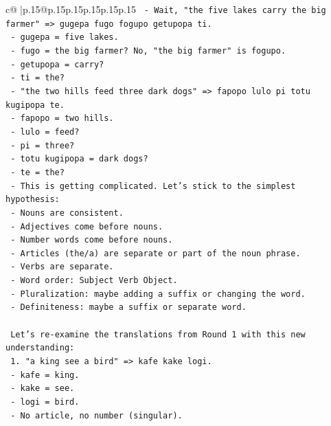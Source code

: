 \documentclass{article}
\begin{document}
{\begin{supertabular}{c@{$\;$}|p{.15\linewidth}@{}p{.15\linewidth}p{.15\linewidth}p{.15\linewidth}p{.15\linewidth}p{.15\linewidth}}
{{{\texttt{        {-} Wait, "the five lakes carry the big farmer" => gugepa fugo fogupo getupopa ti.} \\
\texttt{          {-} gugepa = five lakes.} \\
\texttt{          {-} fugo = the big farmer? No, "the big farmer" is fogupo.} \\
\texttt{          {-} getupopa = carry?} \\
\texttt{          {-} ti = the?} \\
\texttt{        {-} "the two hills feed three dark dogs" => fapopo lulo pi totu kugipopa te.} \\
\texttt{          {-} fapopo = two hills.} \\
\texttt{          {-} lulo = feed?} \\
\texttt{          {-} pi = three?} \\
\texttt{          {-} totu kugipopa = dark dogs?} \\
\texttt{          {-} te = the?} \\
\texttt{        {-} This is getting complicated. Let's stick to the simplest hypothesis:} \\
\texttt{          {-} Nouns are consistent.} \\
\texttt{          {-} Adjectives come before nouns.} \\
\texttt{          {-} Number words come before nouns.} \\
\texttt{          {-} Articles (the/a) are separate or part of the noun phrase.} \\
\texttt{          {-} Verbs are separate.} \\
\texttt{          {-} Word order: Subject Verb Object.} \\
\texttt{          {-} Pluralization: maybe adding a suffix or changing the word.} \\
\texttt{          {-} Definiteness: maybe a suffix or separate word.} \\
\\ 
\texttt{  Let's re{-}examine the translations from Round 1 with this new understanding:} \\
\texttt{  1. "a king see a bird" => kafe kake logi.} \\
\texttt{     {-} kafe = king.} \\
\texttt{     {-} kake = see.} \\
\texttt{     {-} logi = bird.} \\
\texttt{     {-} No article, no number (singular).} \\
}}}
\end{supertabular}}
\end{document}

